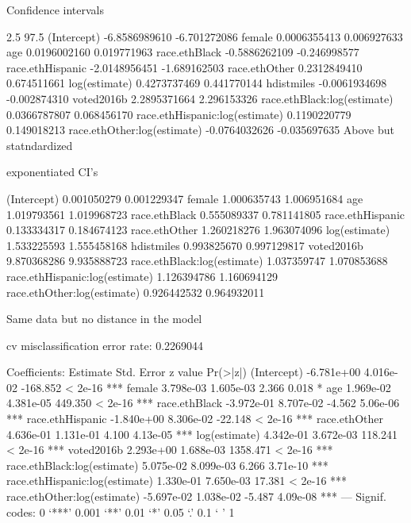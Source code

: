 Confidence intervals

                                    2.5        97.5
(Intercept)                    -6.8586989610 -6.701272086
female                          0.0006355413  0.006927633
age                             0.0196002160  0.019771963
race.ethBlack                  -0.5886262109 -0.246998577
race.ethHispanic               -2.0148956451 -1.689162503
race.ethOther                   0.2312849410  0.674511661
log(estimate)                   0.4273737469  0.441770144
hdistmiles                     -0.0061934698 -0.002874310
voted2016b                      2.2895371664  2.296153326
race.ethBlack:log(estimate)     0.0366787807  0.068456170
race.ethHispanic:log(estimate)  0.1190220779  0.149018213
race.ethOther:log(estimate)    -0.0764032626 -0.035697635
Above but statndardized

exponentiated CI's

(Intercept)                    0.001050279 0.001229347
female                         1.000635743 1.006951684
age                            1.019793561 1.019968723
race.ethBlack                  0.555089337 0.781141805
race.ethHispanic               0.133334317 0.184674123
race.ethOther                  1.260218276 1.963074096
log(estimate)                  1.533225593 1.555458168
hdistmiles                     0.993825670 0.997129817
voted2016b                     9.870368286 9.935888723
race.ethBlack:log(estimate)    1.037359747 1.070853688
race.ethHispanic:log(estimate) 1.126394786 1.160694129
race.ethOther:log(estimate)    0.926442532 0.964932011


Same data but no distance in the model

cv misclassification error rate: 0.2269044

Coefficients:
                                 Estimate Std. Error  z value Pr(>|z|)    
(Intercept)                    -6.781e+00  4.016e-02 -168.852  < 2e-16 ***
female                          3.798e-03  1.605e-03    2.366    0.018 *  
age                             1.969e-02  4.381e-05  449.350  < 2e-16 ***
race.ethBlack                  -3.972e-01  8.707e-02   -4.562 5.06e-06 ***
race.ethHispanic               -1.840e+00  8.306e-02  -22.148  < 2e-16 ***
race.ethOther                   4.636e-01  1.131e-01    4.100 4.13e-05 ***
log(estimate)                   4.342e-01  3.672e-03  118.241  < 2e-16 ***
voted2016b                      2.293e+00  1.688e-03 1358.471  < 2e-16 ***
race.ethBlack:log(estimate)     5.075e-02  8.099e-03    6.266 3.71e-10 ***
race.ethHispanic:log(estimate)  1.330e-01  7.650e-03   17.381  < 2e-16 ***
race.ethOther:log(estimate)    -5.697e-02  1.038e-02   -5.487 4.09e-08 ***
---
Signif. codes:  0 ‘***’ 0.001 ‘**’ 0.01 ‘*’ 0.05 ‘.’ 0.1 ‘ ’ 1

